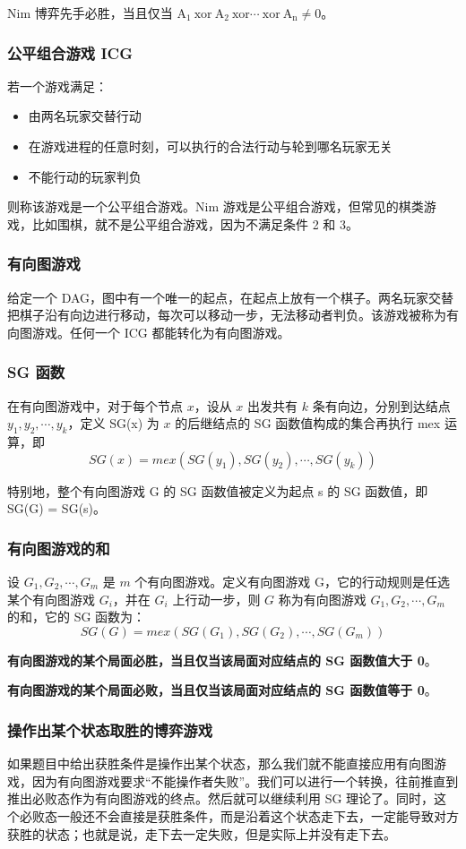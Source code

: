 \documentclass[UTF8]{article}
\begin{document}
Nim 博弈先手必胜，当且仅当 $\mathrm{A_1\ xor\ A_2\ xor \cdots\ xor\ A_n \neq 0}$。


\subsubsection{公平组合游戏 ICG}
若一个游戏满足：
\begin{itemize}
\item 由两名玩家交替行动
\item 在游戏进程的任意时刻，可以执行的合法行动与轮到哪名玩家无关
\item 不能行动的玩家判负
\end{itemize}
则称该游戏是一个公平组合游戏。Nim 游戏是公平组合游戏，但常见的棋类游戏，比如围棋，就不是公平组合游戏，因为不满足条件 2 和 3。


\subsubsection{有向图游戏}
给定一个 DAG，图中有一个唯一的起点，在起点上放有一个棋子。两名玩家交替把棋子沿有向边进行移动，每次可以移动一步，无法移动者判负。该游戏被称为有向图游戏。任何一个 ICG 都能转化为有向图游戏。


\subsubsection{SG 函数}
在有向图游戏中，对于每个节点 $x$，设从 $x$ 出发共有 $k$ 条有向边，分别到达结点 $y_1, y_2, \cdots, y_k$，定义 SG(x) 为 $x$ 的后继结点的 SG 函数值构成的集合再执行 mex 运算，即 
$$
SG(x) = mex({SG(y_1), SG(y_2), \cdots, SG(y_k)})
$$

特别地，整个有向图游戏 G 的 SG 函数值被定义为起点 s 的 SG 函数值，即 SG(G) = SG(s)。


\subsubsection{有向图游戏的和}
设 $G_1, G_2, \cdots, G_m$ 是 $m$ 个有向图游戏。定义有向图游戏 G，它的行动规则是任选某个有向图游戏 $G_i$，并在 $G_i$ 上行动一步，则 $G$ 称为有向图游戏 $G_1, G_2, \cdots, G_m$ 的和，它的 SG 函数为：
$$
SG(G) = mex({SG(G_1), SG(G_2), \cdots, SG(G_m)})
$$

\textbf{有向图游戏的某个局面必胜，当且仅当该局面对应结点的 SG 函数值大于 0}。

\textbf{有向图游戏的某个局面必败，当且仅当该局面对应结点的 SG 函数值等于 0}。


\subsubsection{操作出某个状态取胜的博弈游戏}
如果题目中给出获胜条件是操作出某个状态，那么我们就不能直接应用有向图游戏，因为有向图游戏要求“不能操作者失败”。我们可以进行一个转换，往前推直到推出必败态作为有向图游戏的终点。然后就可以继续利用 SG 理论了。同时，这个必败态一般还不会直接是获胜条件，而是沿着这个状态走下去，一定能导致对方获胜的状态；也就是说，走下去一定失败，但是实际上并没有走下去。
\end{document}

